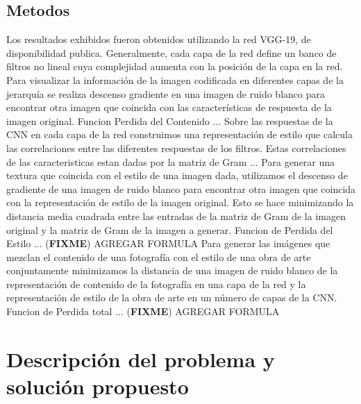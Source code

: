 \documentclass[a4paper,11pt,spanish]{book}
\newcommand*{\FIXME}[1]{{(\textbf{FIXME}) {#1}}}
\begin{document}
    \section{Metodos}
      Los resultados exhibidos fueron obtenidos utilizando la red VGG-19, de disponibilidad publica.
      Generalmente, cada capa de la red define un banco de filtros no lineal cuya complejidad aumenta con la posición de la capa en la red.
      Para visualizar la información de la imagen codificada en diferentes capas de la jerarquía se realiza descenso gradiente en una imagen de ruido blanco 
      para encontrar otra imagen que coincida con las características de respuesta de la imagen original.
      Funcion Perdida del Contenido ...
      Sobre las respuestas de la CNN en cada capa de la red construimos una representación de estilo que calcula las correlaciones entre las diferentes respuestas de los filtros.
      Estas correlaciones de las caracteristicas estan dadas por la matriz de Gram ...
      Para generar una textura que coincida con el estilo de una imagen dada, utilizamos el descenso de gradiente de una imagen de ruido blanco para encontrar otra imagen que coincida 
      con la representación de estilo de la imagen original. Esto se hace minimizando la distancia media cuadrada entre las entradas de la matriz de Gram de la imagen 
      original y la matriz de Gram de la imagen a generar.
      Funcion de Perdida del Estilo ...
      \FIXME{AGREGAR FORMULA}
      Para generar las imágenes que mezclan el contenido de una fotografía con el estilo de una obra de arte conjuntamente minimizamos la distancia de una imagen de ruido blanco 
      de la representación de contenido de la fotografía en una capa de la red y la representación de estilo de la obra de arte en un número de capas de la CNN.
      Funcion de Perdida total ...
      \FIXME{AGREGAR FORMULA}
    
     
\chapter{Descripción del problema y solución propuesto}
\end{document}
